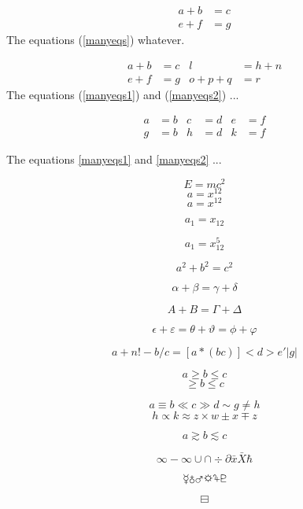 \documentclass[letterpaper,notitlepage,11pt]{article}
\begin{document}
\begin{equation}
\label{manyeqs}
\begin{split}
a+b&=c\\
e+f&=g
\end{split}
\end{equation}
The equations (\ref{manyeqs}) whatever.

\begin{align}
\label{manyeqs1}
a+b&=c & l&=h+n \\
\label{manyeqs2}
e+f&=g & o+p+q&=r
\end{align}
The equations (\ref{manyeqs1}) and (\ref{manyeqs2}) ...

\begin{align*}
a&=b & c&=d & e&=f \\
g&=b & h&=d & k&=f
\end{align*}

The equations \eqref{manyeqs1} and \eqref{manyeqs2} ...

\begin{equation}
E=mc^2
\end{equation}
\[ a=x^12 \]
\[ a=x^{12} \]

\begin{equation}
a_1=x_{12}
\end{equation}

\begin{equation}
a_1=x_{12}^5
\end{equation}

\[ a^2 + b^2 = c^2 \]

\begin{equation}
\alpha + \beta = \gamma + \delta
\end{equation}

\begin{equation}
A + B = \Gamma+\Delta
\end{equation}

\begin{equation}
\epsilon+\varepsilon = \theta+\vartheta=\phi+\varphi
\end{equation}

\[ a+n!-b/c=[a*(bc)]<d>e'|g| \]

\[ a \ge b \le c \]
\[ \geq b \leq c \]

\[a \equiv b \ll c \gg d \sim g \neq h \]
\[h \propto k\approx z \times w \pm x \mp z \]

\[ a \gtrsim b \lesssim c \]

\[ \infty -\infty \cup \cap \div \partial \bar{x} \bar{X} \hbar \]

\begin{equation}
\mercury \earth \mars \sun \jupiter \pluto
\end{equation}

\[ \boxminus \]
\end{document}
